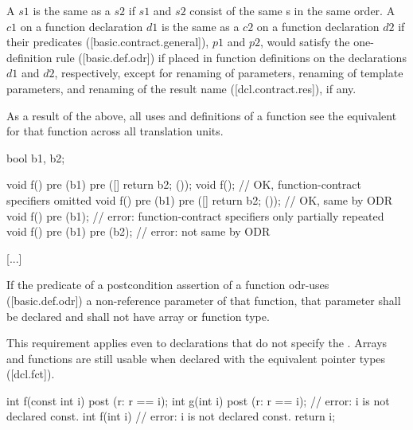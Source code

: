 \begin{adjustwidth}{0.5cm}{0.5cm}
A  $s1$ is the same as a  $s2$ if $s1$ and $s2$ consist of the same s in the same order. A  $c1$ on a function declaration $d1$ is the same as a 
$c2$ on a function declaration $d2$ if their predicates ([basic.contract.general]), $p1$ and $p2$,
would satisfy the one-definition rule ([basic.def.odr]) if placed in function definitions on
the declarations $d1$ and $d2$, respectively, except for renaming of parameters, renaming of
template parameters, and renaming of the result name ([dcl.contract.res]), if any.
\begin{note}
As a result of the above, all uses and definitions of a function see the equivalent
 for that function across all translation units.
\end{note}
\begin{addedblock}
\begin{example}
\begin{codeblock}
bool b1, b2;

void f() pre (b1) pre ([]{ return b2; }());
void f();                    // OK, function-contract specifiers omitted
void f() pre (b1) pre ([]{ return b2; }());  // OK, same by ODR
void f() pre (b1);           // error: function-contract specifiers only partially repeated
void f() pre (b1) pre (b2);  // error: not same by ODR
\end{codeblock}
\end{example}
\end{addedblock}

[...]

If the predicate of a postcondition assertion of a function odr-uses ([basic.def.odr]) a
non-reference parameter of that function, that parameter shall be declared  and
shall not have array or function type.
\begin{note}
This requirement applies even to declarations that do not specify the . Arrays and functions are still usable when
declared with the equivalent pointer types ([dcl.fct]). 
\end{note}
\begin{example}
\begin{codeblock}
int f(const int i)
post (r: r == i);
int g(int i)
post (r: r == i); // error: i is not declared const.
int f(int i) // error: i is not declared const.
{
  return i;
}


\end{codeblock}
\end{example}
\end{adjustwidth}
